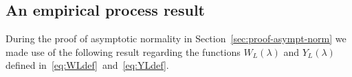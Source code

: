 \documentclass[journal]{IEEEtran}
\begin{document}

\subsection{An empirical process result}\label{sec:an-empirical-process}

During the proof of asymptotic normality in Section~\ref{sec:proof-asympt-norm} we made use of the following result regarding the functions $W_L(\lambda)$ and $Y_L(\lambda)$ defined in~\eqref{eq:WLdef}~and~\eqref{eq:YLdef}.
\end{document}
